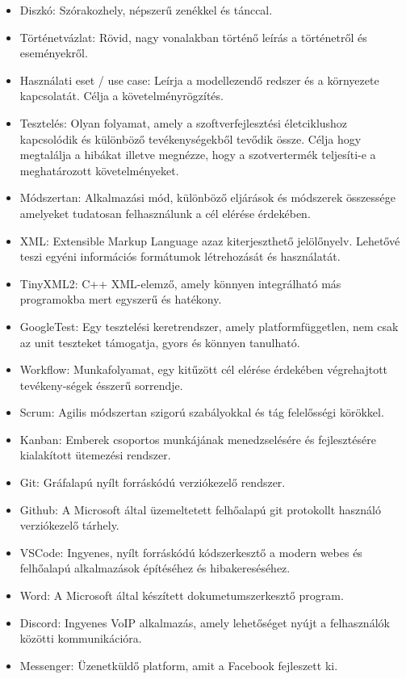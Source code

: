 \documentclass{scrarticle}
\begin{document}
\begin{itemize}
    \item Diszkó: Szórakozhely, népszerű zenékkel és tánccal.
    \item Történetvázlat: Rövid, nagy vonalakban történő leírás a történetről és eseményekről. 
    \item Használati eset / use case: Leírja a modellezendő redszer és a környezete kapcsolatát. Célja a követelményrögzítés.
    \item Tesztelés: Olyan folyamat, amely a szoftverfejlesztési életciklushoz kapcsolódik és különböző tevékenységekből tevődik össze. Célja hogy megtalálja a hibákat illetve megnézze, hogy a szotvertermék teljesíti-e a meghatározott követelményeket.
    \item Módszertan: Alkalmazási mód, különböző eljárások és módszerek összessége amelyeket tudatosan felhasználunk a cél elérése érdekében.
    \item XML: Extensible Markup Language azaz kiterjeszthető jelölőnyelv. Lehetővé teszi egyéni információs formátumok létrehozását és használatát.
    \item TinyXML2: C++ XML-elemző, amely könnyen integrálható más programokba mert egyszerű és hatékony.
    \item GoogleTest: Egy tesztelési keretrendszer, amely platformfüggetlen, nem csak az unit teszteket támogatja, gyors és könnyen tanulható. 
    \item Workflow: Munkafolyamat, egy kitűzött cél elérése érdekében végrehajtott tevékeny-ségek ésszerű sorrendje. 
    \item Scrum: Agilis módszertan szigorú szabályokkal és tág felelősségi körökkel.
    \item Kanban: Emberek csoportos munkájának menedzselésére és fejlesztésére kialakított ütemezési rendszer.
    \item Git: Gráfalapú nyílt forráskódú verziókezelő rendszer.
    \item Github: A Microsoft által üzemeltetett felhőalapú git protokollt használó verziókezelő tárhely. 
    \item VSCode: Ingyenes, nyílt forráskódú kódszerkesztő a modern webes és felhőalapú alkalmazások építéséhez és hibakereséséhez.
    \item Word: A Microsoft által készített dokumetumszerkesztő program.
    \item Discord: Ingyenes VoIP alkalmazás, amely lehetőséget nyújt a felhasználók közötti kommunikációra.
    \item Messenger: Üzenetküldő platform, amit a Facebook fejleszett ki.  
\end{itemize}
\end{document}
